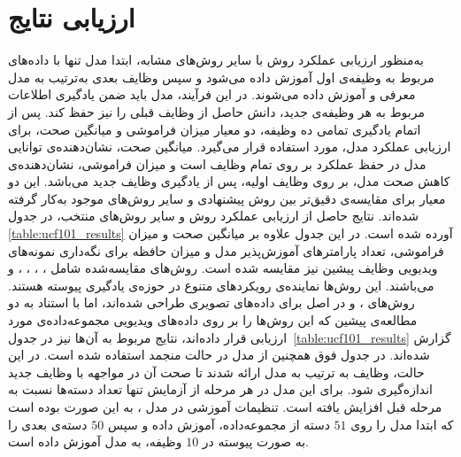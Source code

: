 \section{ارزیابی نتایج}
به‌منظور ارزیابی عملکرد روش 
با سایر روش‌های مشابه، ابتدا مدل تنها با داده‌های مربوط به وظیفه‌ی اول آموزش داده می‌شود و سپس وظایف بعدی به‌ترتیب به مدل معرفی و آموزش داده می‌شوند. در این فرآیند، مدل باید ضمن یادگیری اطلاعات مربوط به هر وظیفه‌ی جدید، دانش حاصل از وظایف قبلی را نیز حفظ کند. پس از اتمام یادگیری تمامی ده وظیفه، دو معیار میزان فراموشی و میانگین صحت، برای ارزیابی عملکرد مدل، مورد استفاده قرار می‌گیرد. میانگین صحت، نشان‌دهنده‌ی توانایی مدل در حفظ عملکرد بر روی تمام وظایف است و میزان فراموشی، نشان‌دهنده‌ی کاهش صحت مدل، بر روی وظایف اولیه، پس از یادگیری وظایف جدید می‌باشد. این دو معیار برای مقایسه‌ی دقیق‌تر بین روش پیشنهادی و سایر روش‌های موجود به‌کار گرفته شده‌اند. 
نتایج حاصل از ارزیابی عملکرد روش  و سایر روش‌های منتخب، در جدول
\ref{table:ucf101_results}
آورده شده است. در این جدول علاوه بر میانگین صحت و میزان فراموشی، تعداد پارامترهای آموزش‌پذیر مدل و میزان حافظه‌ برای نگه‌داری نمونه‌های ویدیویی وظایف پیشین نیز مقایسه شده است.
روش‌های مقایسه‌شده شامل \cite{11}،
 \cite{7}،
  \cite{l2p}، \cite{TCD}،
 \cite{pivot} و \cite{open-vclip} می‌باشند. این روش‌ها نماینده‌ی رویکردهای متنوع در حوزه‌ی یادگیری پیوسته هستند. روش‌های ،  و  در اصل برای داده‌های تصویری طراحی شده‌اند، اما با استناد به دو مطالعه‌ی پیشین \cite{vclimb,rainbowprompt} که این روش‌ها را بر روی داده‌های ویدیویی مجموعه‌داده‌ی  مورد ارزیابی قرار داده‌اند، نتایج مربوط به آن‌ها نیز در
جدول~\ref{table:ucf101_results}
گزارش شده‌اند. در جدول فوق همچنین از مدل  در حالت منجمد استفاده شده است.  در این حالت، وظایف به ترتیب به مدل ارائه شدند تا صحت آن در مواجهه با وظایف جدید اندازه‌گیری شود. برای این مدل در هر مرحله از آزمایش تنها تعداد دسته‌ها نسبت به مرحله قبل افزایش یافته است. تنظیمات آموزشی در مدل ، به این صورت بوده است که ابتدا مدل را روی $51$ دسته از مجموعه‌داده، آموزش داده و سپس $50$ دسته‌ی بعدی را به صورت پیوسته در $10$ وظیفه، به مدل آموزش داده است. 
